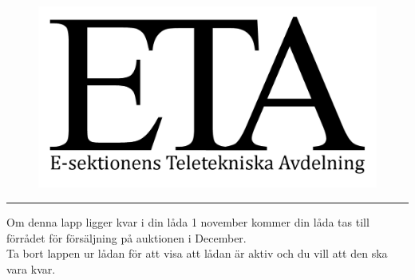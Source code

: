 \documentclass[a4paper, 60pt]{article}
\begin{document}
        \begin{center}
            \begin{figure}[h]
                \includegraphics[scale = 2]{ETA-logga.png}
            \end{figure}
            \vspace{25pt}
            \newline
            \noindent\rule{\textwidth}{1pt}
                       \newline      %
            \Large Om denna lapp ligger kvar i din låda 1 november kommer din låda tas till förrådet för försäljning på auktionen i December. \\ Ta bort lappen ur lådan för att visa att lådan är aktiv och du vill att den ska vara kvar.
            
        \end{center}
\end{document}
